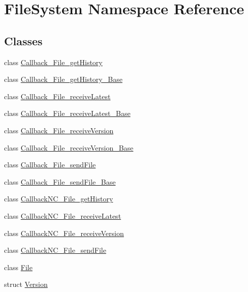 \hypertarget{namespace_file_system}{}\section{File\+System Namespace Reference}
\label{namespace_file_system}
\subsection*{Classes}
\begin{DoxyCompactItemize}
\item 
class \hyperlink{class_file_system_1_1_callback___file__get_history}{Callback\+\_\+\+File\+\_\+get\+History}
\item 
class \hyperlink{class_file_system_1_1_callback___file__get_history___base}{Callback\+\_\+\+File\+\_\+get\+History\+\_\+\+Base}
\item 
class \hyperlink{class_file_system_1_1_callback___file__receive_latest}{Callback\+\_\+\+File\+\_\+receive\+Latest}
\item 
class \hyperlink{class_file_system_1_1_callback___file__receive_latest___base}{Callback\+\_\+\+File\+\_\+receive\+Latest\+\_\+\+Base}
\item 
class \hyperlink{class_file_system_1_1_callback___file__receive_version}{Callback\+\_\+\+File\+\_\+receive\+Version}
\item 
class \hyperlink{class_file_system_1_1_callback___file__receive_version___base}{Callback\+\_\+\+File\+\_\+receive\+Version\+\_\+\+Base}
\item 
class \hyperlink{class_file_system_1_1_callback___file__send_file}{Callback\+\_\+\+File\+\_\+send\+File}
\item 
class \hyperlink{class_file_system_1_1_callback___file__send_file___base}{Callback\+\_\+\+File\+\_\+send\+File\+\_\+\+Base}
\item 
class \hyperlink{class_file_system_1_1_callback_n_c___file__get_history}{Callback\+N\+C\+\_\+\+File\+\_\+get\+History}
\item 
class \hyperlink{class_file_system_1_1_callback_n_c___file__receive_latest}{Callback\+N\+C\+\_\+\+File\+\_\+receive\+Latest}
\item 
class \hyperlink{class_file_system_1_1_callback_n_c___file__receive_version}{Callback\+N\+C\+\_\+\+File\+\_\+receive\+Version}
\item 
class \hyperlink{class_file_system_1_1_callback_n_c___file__send_file}{Callback\+N\+C\+\_\+\+File\+\_\+send\+File}
\item 
class \hyperlink{class_file_system_1_1_file}{File}
\item 
struct \hyperlink{struct_file_system_1_1_version}{Version}
\end{DoxyCompactItemize}
